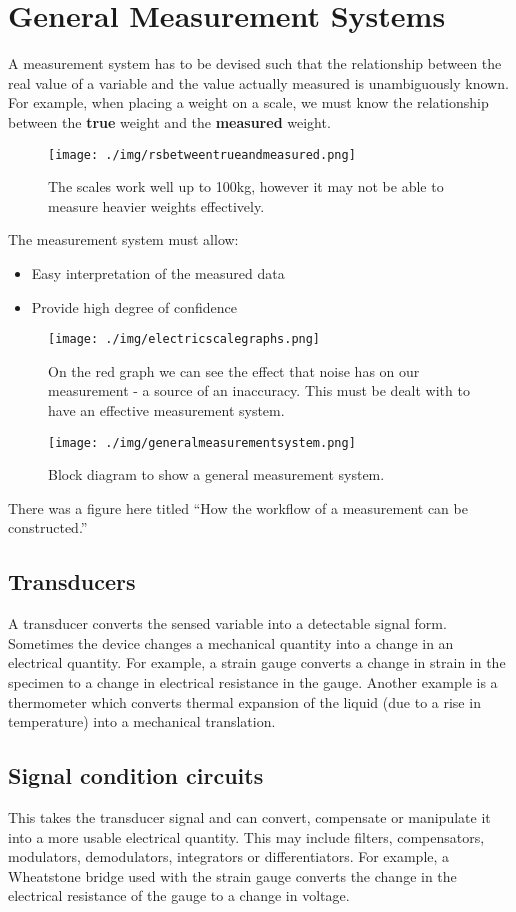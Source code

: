 \chapter{General Measurement Systems}
A measurement system has to be devised such that the relationship between the real value of a variable and the value actually measured is unambiguously known. For example, when placing a weight on a scale, we must know the relationship between the \textbf{true} weight and the \textbf{measured} weight.
\begin{figure}
  \centering
  \texttt{[image: ./img/rsbetweentrueandmeasured.png]}
  \caption{The scales work well up to 100kg, however it may not be able to measure heavier weights effectively.}
\end{figure}
The measurement system must allow:
\begin{itemize}
  \item Easy interpretation of the measured data
  \item Provide high degree of confidence
\end{itemize}
\begin{figure}
  \centering
  \texttt{[image: ./img/electricscalegraphs.png]}
  \caption{On the red graph we can see the effect that noise has on our measurement - a source of an inaccuracy. This must be dealt with to have an effective measurement system.}
\end{figure}
\begin{figure}
  \centering
  \texttt{[image: ./img/generalmeasurementsystem.png]}
  \caption{Block diagram to show a general measurement system.}
\end{figure}

There was a figure here titled ``How the workflow of a measurement can be constructed.''

\section{Transducers}
A transducer converts the sensed variable into a detectable signal form. Sometimes the device changes a mechanical quantity into a change in an  electrical quantity. For example, a strain gauge converts a change in strain in the specimen to a change in electrical resistance in the gauge. Another example is a thermometer which converts thermal expansion of the liquid (due to a rise in temperature) into a mechanical translation.
\section{Signal condition circuits}
This takes the transducer signal and can convert, compensate or manipulate it into a more usable electrical quantity. This may include filters, compensators, modulators, demodulators, integrators or differentiators. For example, a Wheatstone bridge used with the strain gauge converts the change in the electrical resistance of the gauge to a change in voltage.
